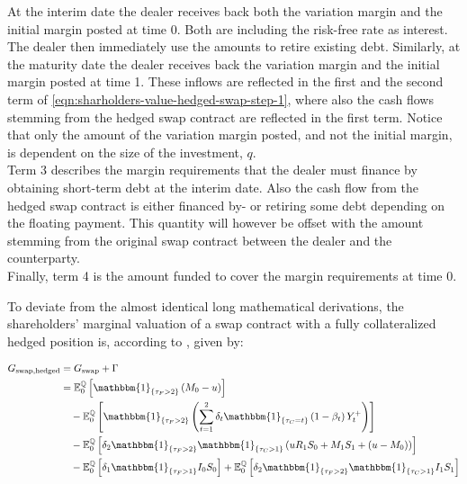 \documentclass[main.tex]{subfiles}
\begin{document}
        At the interim date the dealer receives back both the variation margin and the initial margin posted at time 0.
        Both are including the risk-free rate as interest.
        The dealer then immediately use the amounts to retire existing debt.
        Similarly, at the maturity date the dealer receives back the variation margin and the initial margin posted at time 1.
        These inflows are reflected in the first and the second term of \cref{eqn:sharholders-value-hedged-swap-step-1},
        where also the cash flows stemming from the hedged swap contract are reflected in the first term.
        Notice that only the amount of the variation margin posted,
        and not the initial margin,
        is dependent on the size of the investment, $q$.
        \\
        Term 3 describes the margin requirements that the dealer must finance by obtaining short-term debt at the interim date.
        Also the cash flow from the hedged swap contract is either financed by- or retiring some debt depending on the floating payment.
        This quantity will however be offset with the amount stemming from the original swap contract between the dealer and the counterparty.
        \\
        Finally, term 4 is the amount funded to cover the margin requirements at time 0.

        To deviate from the almost identical long mathematical derivations,
        the shareholders' marginal valuation of a swap contract with a fully collateralized hedged position is, according to \textcite{ADS2018}, given by:

        \begin{align}
            G_{\text{swap,hedged}} &= G_{\text{swap}} + \Gamma
            \\
            &=
            \mathbb{E}_{0}^{\rnmeasure}\left[
                \mathbbm{1}_{\{\tau_{F}>2\}}
                \left(
                    M_0 - u
                \right)
            \right]
            \nonumber
            \\
            &\quad-
            \mathbb{E}_{0}^{\rnmeasure}\left[
                \mathbbm{1}_{\{\tau_{F}>2\}}
                \left(
                    \sum_{t=1}^{2} \delta_{t} \mathbbm{1}_{\{\tau_{C}=t\}}\left(1-\beta_t\right)Y_{t}^{+}
                \right)
            \right]
            \nonumber
            \\
            &\quad-
            \mathbb{E}_{0}^{\rnmeasure}\left[
                \delta_2 \mathbbm{1}_{\{\tau_{F}>2\}} \mathbbm{1}_{\{\tau_{C}>1\}}
                \left(
                    u R_{1} S_{0} + M_{1} S_{1} + (u - M_0)
                \right)
            \right]
            \nonumber
            \\
            &\quad-
            \mathbb{E}_{0}^{\rnmeasure}\left[
                \delta_1 \mathbbm{1}_{\{\tau_{F}>1\}}
                I_0 S_0 
            \right] 
            +
            \mathbb{E}_{0}^{\rnmeasure}\left[
                \delta_2 \mathbbm{1}_{\{\tau_{F}>2\}} \mathbbm{1}_{\{\tau_{C}>1\}}
                I_1 S_1 
            \right] 
        \end{align}
\end{document}

